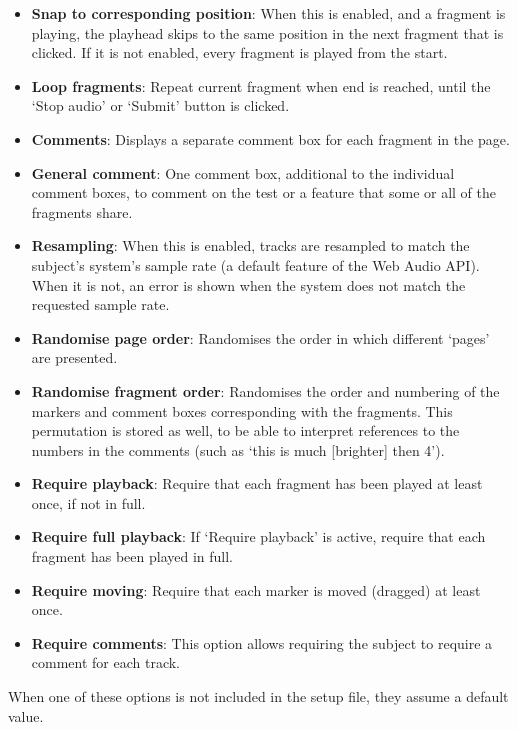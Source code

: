 \documentclass{article}
\begin{document}
\begin{itemize}
\item \textbf{Snap to corresponding position}: When this is enabled, and a fragment is playing, the playhead skips to the same position in the next fragment that is clicked. If it is not enabled, every fragment is played from the start. 
\item \textbf{Loop fragments}: Repeat current fragment when end is reached, until the `Stop audio' or `Submit' button is clicked. 
\item \textbf{Comments}: Displays a separate comment box for each fragment in the page.
\item \textbf{General comment}: One comment box, additional to the individual comment boxes, to comment on the test or a feature that some or all of the fragments share. 
\item \textbf{Resampling}: When this is enabled, tracks are resampled to match the subject's system's sample rate (a default feature of the Web Audio API). When it is not, an error is shown when the system does not match the requested sample rate. 
\item \textbf{Randomise page order}: Randomises the order in which different `pages' are presented. %
\item \textbf{Randomise fragment order}: Randomises the order and numbering of the markers and comment boxes corresponding with the fragments. This permutation is stored as well, to be able to interpret references to the numbers in the comments (such as `this is much [brighter] then 4'). 
\item \textbf{Require playback}: Require that each fragment has been played at least once, if not in full. 
\item \textbf{Require full playback}: If `Require playback' is active, require that each fragment has been played in full. 
\item \textbf{Require moving}: Require that each marker is moved (dragged) at least once. 
\item \textbf{Require comments}: This option allows requiring the subject to require a comment for each track. 
\end{itemize}

When one of these options is not included in the setup file, they assume a default value. 

\end{document}
